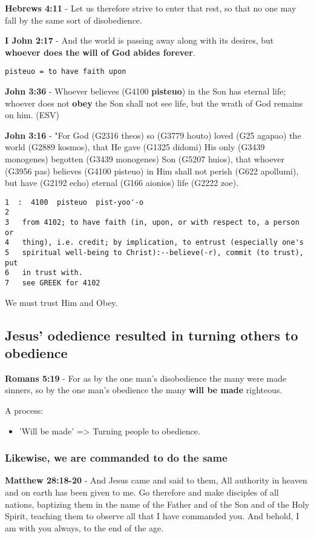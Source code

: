 \documentclass[11pt]{article}
\begin{document}
\textbf{Hebrews 4:11} - Let us therefore strive to enter that rest, so that no one may fall by the same sort of disobedience.

\textbf{I John 2:17} - And the world is passing away along with its desires, but \textbf{whoever does the will of God abides forever}.

\texttt{pisteuo = to have faith upon}

\textbf{John 3:36} - Whoever believes (G4100 \textbf{pisteuo}) in the Son has eternal life; whoever does not \textbf{obey} the Son shall not see life, but the wrath of God remains on him. (ESV)

\textbf{John 3:16} - "For God (G2316 theos) so (G3779 houto) loved (G25 agapao) the world (G2889 kosmos), that He gave (G1325 didomi) His only (G3439 monogenes) begotten (G3439 monogenes) Son (G5207 huios), that whoever (G3956 pas) believes (G4100 pisteuo) in Him shall not perish (G622 apollumi), but have (G2192 echo) eternal (G166 aionios) life (G2222 zoe).

\begin{verbatim}
1  :  4100  pisteuo  pist-yoo'-o
2  
3   from 4102; to have faith (in, upon, or with respect to, a person or
4   thing), i.e. credit; by implication, to entrust (especially one's
5   spiritual well-being to Christ):--believe(-r), commit (to trust), put
6   in trust with.
7   see GREEK for 4102
\end{verbatim}

We must trust Him and Obey.

\subsection{Jesus' odedience resulted in turning others to obedience}
\label{sec:orge652e9f}
\textbf{Romans 5:19} - For as by the one man's disobedience the many were made sinners, so by the one man's obedience the many \textbf{will be made} righteous.

A process:
\begin{itemize}
\item 'Will be made' => Turning people to obedience.
\end{itemize}

\subsubsection{Likewise, we are commanded to do the same}
\label{sec:org5d9e6a3}
\textbf{Matthew 28:18-20} - And Jesus came and said to them, All authority in heaven and on earth has been given to me. Go therefore and make disciples of all nations, baptizing them in the name of the Father and of the Son and of the Holy Spirit, teaching them to observe all that I have commanded you. And behold, I am with you always, to the end of the age.
\end{document}
